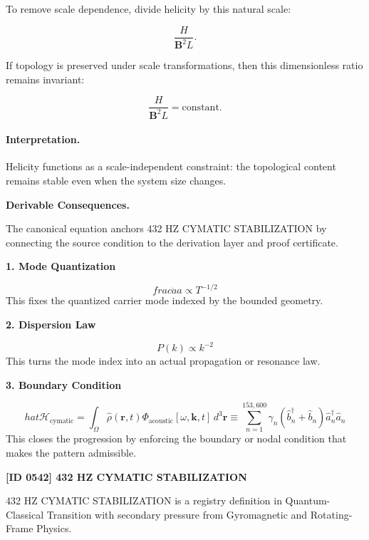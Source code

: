 To remove scale dependence, divide helicity by this natural scale:

\begin{equation}
\frac{H}{\mathbf{B}^2L}.
\end{equation}

If topology is preserved under scale transformations, then this dimensionless ratio remains invariant:

\begin{equation}
\boxed{
\frac{H}{\mathbf{B}^2 L}
=
\mathrm{constant}.
}
\end{equation}

\paragraph{Interpretation.}
Helicity functions as a scale-independent constraint: the topological content remains stable even when the system size changes.

\par\vspace{0.35em}
\noindent\textbf{Derivable Consequences.}\quad
\begingroup
\footnotesize
\raggedright
The canonical equation anchors 432 HZ CYMATIC STABILIZATION by connecting the source condition to the derivation layer and proof certificate.
\par\endgroup

\noindent\textbf{1. Mode Quantization}\par
\[
frac{\ddot{a}}{a} \propto T^{-1/2}
\]
\noindent This fixes the quantized carrier mode indexed by the bounded geometry.\par
\noindent\textbf{2. Dispersion Law}\par
\[
P(k) \propto k^{-2}
\]
\noindent This turns the mode index into an actual propagation or resonance law.\par
\noindent\textbf{3. Boundary Condition}\par
\[
hat{\mathcal{H}}_{\text{cymatic}} = \int_{\Omega} \hat{\rho}(\mathbf{r}, t) \Phi_{\text{acoustic}}[\omega, \mathbf{k}, t] \, d^3\mathbf{r} \equiv \sum_{n=1}^{153,600} \gamma_n (\hat{b}_n^\dagger + \hat{b}_n) \hat{a}_n^\dagger \hat{a}_n
\]
\noindent This closes the progression by enforcing the boundary or nodal condition that makes the pattern admissible.\par

\clearpage
\noindent\textbf{[ID 0542] 432 HZ CYMATIC STABILIZATION}\par
\vspace{0.35em}
\begingroup\small
{}
432 HZ CYMATIC STABILIZATION is a registry definition in Quantum-Classical Transition with secondary pressure from Gyromagnetic and Rotating-Frame Physics.

